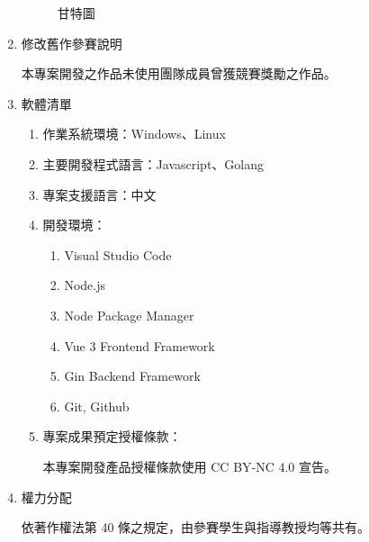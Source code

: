\documentclass[12pt]{article}
\begin{document}
\begin{enumerate}
\begin{figure}[htb]
\begin{ganttchart}
      \end{ganttchart}
      \caption{甘特圖}  
    \end{figure}
  \item 修改舊作參賽說明
    \par 本專案開發之作品未使用團隊成員曾獲競賽獎勵之作品。
  \item 軟體清單
    \begin{enumerate}
      \item 作業系統環境：Windows、Linux
      \item 主要開發程式語言：Javascript、Golang
      \item 專案支援語言：中文
      \item 開發環境：
        \begin{enumerate}
          \item Visual Studio Code
          \item Node.js
          \item Node Package Manager
          \item Vue 3 Frontend Framework
          \item Gin Backend Framework
          \item Git, Github
        \end{enumerate}
      \item 專案成果預定授權條款：
        \par 本專案開發產品授權條款使用 CC BY-NC 4.0 宣告。
    \end{enumerate}
  \item 權力分配
    \par 依著作權法第 40 條之規定，由參賽學生與指導教授均等共有。

\end{enumerate}
\end{document}
